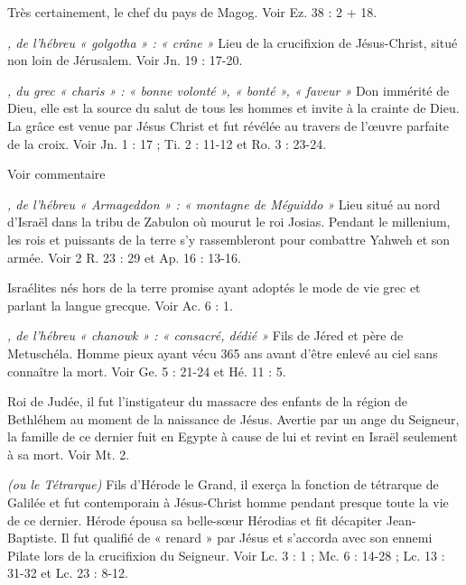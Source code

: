 \begin{multicols}{2}
\textit{}\newline
Très certainement, le chef du pays de Magog. Voir Ez. 38 : 2 + 18.

\textit{, de l’hébreu « golgotha » : « crâne »}\newline
Lieu de la crucifixion de Jésus-Christ, situé non loin de Jérusalem. Voir Jn. 19 : 17-20.

\textit{, du grec « charis » : « bonne volonté », « bonté », « faveur »}\newline
Don immérité de Dieu, elle est la source du salut de tous les hommes et invite à la crainte de Dieu. La grâce est venue par Jésus Christ et fut révélée au travers de l’œuvre parfaite de la croix. Voir Jn. 1 : 17 ; Ti. 2 : 11-12 et Ro. 3 : 23-24.

\textit{}\newline
Voir commentaire

\textit{, de l’hébreu « Armageddon » : « montagne de Méguiddo »}\newline
Lieu situé au nord d'Israël dans la tribu de Zabulon où mourut le roi Josias. Pendant le millenium, les rois et puissants de la terre s’y rassembleront pour combattre Yahweh et son armée. Voir 2 R. 23 : 29 et Ap. 16 : 13-16.

\textit{}\newline
Israélites nés hors de la terre promise ayant adoptés le mode de vie grec et parlant la langue grecque. Voir Ac. 6 : 1.

\textit{, de l’hébreu « chanowk » : « consacré, dédié »}\newline
Fils de Jéred et père de Metuschéla. Homme pieux ayant vécu 365 ans avant d’être enlevé au ciel sans connaître la mort. Voir Ge. 5 : 21-24 et Hé. 11 : 5.

\textit{}\newline
Roi de Judée, il fut l'instigateur du massacre des enfants de la région de Bethléhem au moment de la naissance de Jésus. Avertie par un ange du Seigneur, la famille de ce dernier fuit en Egypte à cause de lui et revint en Israël seulement à sa mort. Voir Mt. 2.

\textit{(ou le Tétrarque)}\newline
Fils d'Hérode le Grand, il exerça la fonction de tétrarque de Galilée et fut contemporain à Jésus-Christ homme pendant presque toute la vie de ce dernier. Hérode épousa sa belle-sœur Hérodias et fit décapiter Jean-Baptiste. Il fut qualifié de « renard » par Jésus et s’accorda avec son ennemi Pilate lors de la crucifixion du Seigneur. Voir Lc. 3 : 1 ; Mc. 6 : 14-28 ; Lc. 13 : 31-32 et Lc. 23 : 8-12.


\end{multicols}
